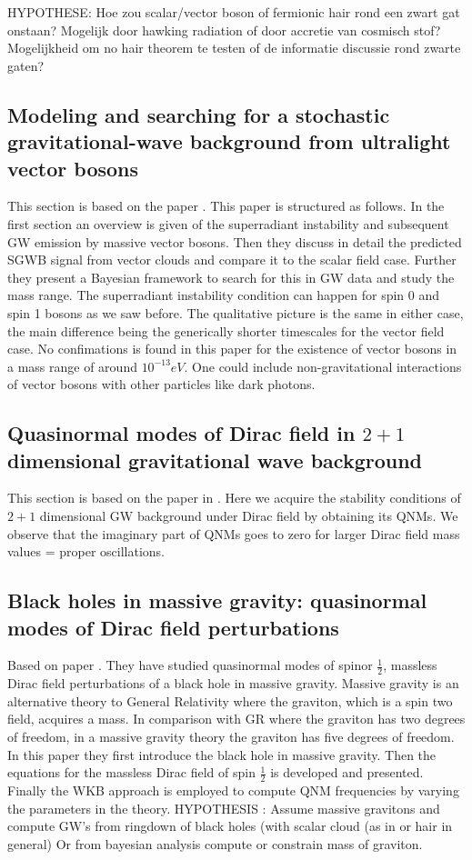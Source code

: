 \documentclass[12 pt]{article}
\begin{document}
	
	
	HYPOTHESE: Hoe zou  scalar/vector boson of fermionic hair rond een zwart gat onstaan? Mogelijk door hawking radiation of door accretie van cosmisch stof? Mogelijkheid om no hair theorem te testen of de informatie discussie rond zwarte gaten?
	
	\subsection{Modeling and searching for a stochastic gravitational-wave background
		from ultralight vector bosons}
	This section is based on the paper \cite{modelingproca}.
	This paper is structured as follows. In the first section an overview is given of the superradiant instability and
	subsequent GW emission by massive vector bosons. Then they discuss in detail the predicted SGWB signal from vector clouds and compare it to the scalar field case. Further they present a Bayesian framework to search for this in GW data and study the mass range.
	The superradiant instability condition can happen for spin 0 and spin 1 bosons as we saw before. The qualitative picture is the same in either case, the main difference being the generically shorter timescales for the vector field case.
	No confimations is found in this paper for the existence of vector bosons in a mass range of around $10^{-13} eV$. One could include non-gravitational interactions of vector bosons with other particles like dark photons.
	
	\subsection{Quasinormal modes of Dirac field in $2 + 1$ dimensional gravitational
		wave background}
	This section is based on the paper in \cite{dirac2+1}. Here we acquire the
	stability conditions of $2 + 1$ dimensional GW background under Dirac field by obtaining its QNMs.
	We observe that the imaginary part of QNMs goes to zero for larger Dirac field mass values = proper oscillations. 
	
	\subsection{Black holes in massive gravity: quasinormal modes
		of Dirac field perturbations}
	Based on paper \cite{QNMDIRAC}.
	They have studied quasinormal modes of spinor $\frac{1}{2}$, massless Dirac field perturbations of a black hole in massive gravity. Massive gravity is an alternative theory to General Relativity where the graviton, which is a spin two field, acquires a mass.  In comparison with GR where the graviton has two degrees of freedom, in a massive gravity theory the graviton has five degrees of freedom. In this paper they first introduce the black hole in massive gravity. Then the equations for the massless Dirac field of spin $\frac{1}{2}$ is developed and presented. Finally the WKB approach is employed to compute QNM frequencies by varying the parameters in the theory. HYPOTHESIS : Assume massive gravitons and compute GW's from ringdown of black holes (with scalar cloud (as in \cite{MASSIVETHEORYSCALAR} or hair in general) Or from bayesian analysis compute or constrain mass of graviton.
	
\end{document}
